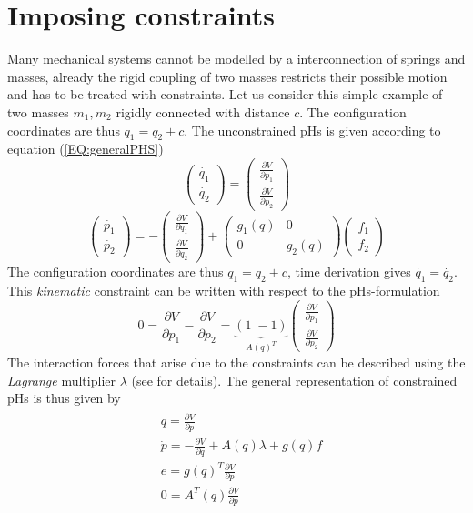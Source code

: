 \documentclass[a4paper,twoside, openright,12pt]{report}
\begin{document}
\section{Imposing constraints}
Many mechanical systems cannot be modelled by a interconnection of springs and masses, already the rigid coupling of two masses restricts their possible motion and has to be treated with constraints.
Let us consider this simple example of two masses $m_1,m_2$ rigidly connected with distance $c$.
The configuration coordinates are thus $q_1 = q_2 + c$.
The unconstrained pHs is given according to equation (\ref{EQ:generalPHS})
\[\begin{pmatrix}\dot{q_1} \\ \dot{q_2}\end{pmatrix} = \begin{pmatrix}
\frac{\partial V}{\partial p_1} \\ \frac{\partial V}{\partial p_2}
\end{pmatrix} \]
\[\begin{pmatrix}\dot{p_1} \\ \dot{p_2}\end{pmatrix} = -\begin{pmatrix}
\frac{\partial V}{\partial q_1} \\ \frac{\partial V}{\partial q_2}
\end{pmatrix}  + \begin{pmatrix}g_1(q) & 0 \\ 0 & g_2(q)\end{pmatrix} \begin{pmatrix}f_1 \\ f_2\end{pmatrix}
\]
The configuration coordinates are thus $q_1 = q_2 + c$, time derivation gives $\dot{q_1}=\dot{q_2}$.
This \emph{kinematic} constraint can be written with respect to the pHs-formulation
\[ 0 =  \frac{\partial V}{\partial p_1} - \frac{\partial V}{\partial p_2} = \underbrace{(1 \; -1)}_{A(q)^T} \begin{pmatrix}
\frac{\partial V}{\partial p_1} \\ \frac{\partial V}{\partial p_2}
\end{pmatrix} \]
The interaction forces that arise due to the constraints can be described using the \emph{Lagrange} multiplier $\lambda$ (see \cite{Schaft_13} for details). The general representation of constrained pHs is thus given by
\begin{eqnarray}\label{EQ:PHSpconstrained}
\begin{aligned}
& \dot{q} = \frac{\partial V}{\partial p} \\
& \dot{p} = -\frac{\partial V}{\partial q} + A(q)\lambda + g(q)f  \\
& e = g(q)^T \frac{\partial V}{\partial p} \\
& 0 = A^T(q) \frac{\partial V}{\partial p} 
\end{aligned}
\end{eqnarray}
\end{document}
